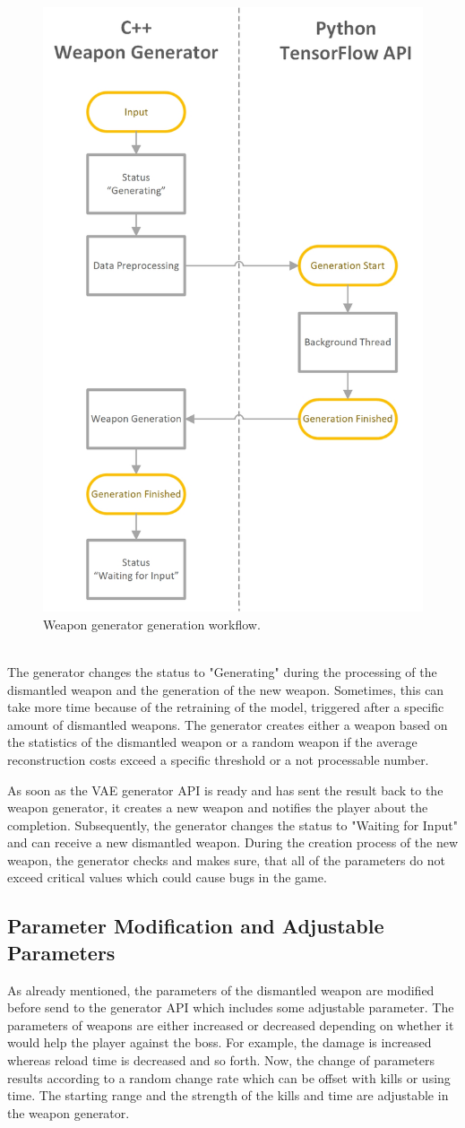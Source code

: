 \documentclass[MGS,Master,english]{twbook}%
\begin{document}
\begin{figure}[!ht]
	\centering
	\includegraphics[width=0.5\linewidth]{PICs/WeaponGeneratorWorkflow_Generation}
	\caption{Weapon generator generation workflow.} \label{figure::weaponGen::gen}
\end{figure}\\
The generator changes the status to "Generating" during the processing of the dismantled weapon and the generation of the new weapon. Sometimes, this can take more time because of the retraining of the model, triggered after a specific amount of dismantled weapons. The generator creates either a weapon based on the statistics of the dismantled weapon or a random weapon if the average reconstruction costs exceed a specific threshold or a not processable number.

As soon as the VAE generator API is ready and has sent the result back to the weapon generator, it creates a new weapon and notifies the player about the completion. Subsequently, the generator changes the status to "Waiting for Input" and can receive a new dismantled weapon. During the creation process of the new weapon, the generator checks and makes sure, that all of the parameters do not exceed critical values which could cause bugs in the game. 

\subsection{Parameter Modification and Adjustable Parameters}
As already mentioned, the parameters of the dismantled weapon are modified before send to the generator API which includes some adjustable parameter. The parameters of weapons are either increased or decreased depending on whether it would help the player against the boss. For example, the damage is increased whereas reload time is decreased and so forth. Now, the change of parameters results according to a random change rate which can be offset with kills or using time. The starting range and the strength of the kills and time are adjustable in the weapon generator. 
\end{document}
